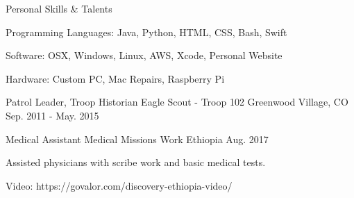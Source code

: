\vspace{-2.0mm}

\begin{cventries}
  \cventry
    {Personal} %
    {Skills \& Talents} %
    {} %
    {} %
    {
      \begin{cvitems} %
        \item {Programming Languages: Java, Python, HTML, CSS, Bash, Swift}
        \item {Software: OSX, Windows, Linux, AWS, Xcode, Personal Website}
        \item {Hardware: Custom PC, Mac Repairs, Raspberry Pi}
      \end{cvitems}
    }

  \cventry
    {Patrol Leader, Troop Historian} %
    {Eagle Scout - Troop 102} %
    {Greenwood Village, CO} %
    {Sep. 2011 - May. 2015} %

\cventry
    {Medical Assistant} %
    {Medical Missions Work} %
    {Ethiopia} %
    {Aug. 2017} %
    {
      \begin{cvitems} %
        \item {Assisted physicians with scribe work and basic medical tests.}
        \item {Video: https://govalor.com/discovery-ethiopia-video/}
      \end{cvitems}
    }

\end{cventries}
